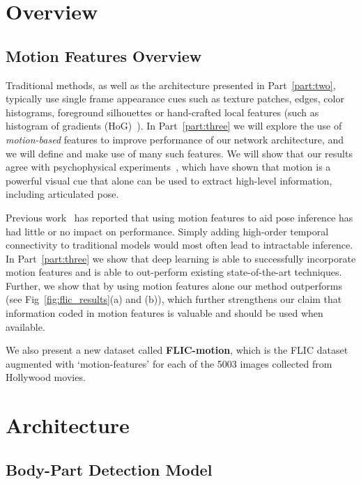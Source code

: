 \chapter{Overview\label{chap:3_video_body_tracking_overview}}

\section{Motion Features Overview}

Traditional methods, as well as the architecture presented in Part~\ref{part:two}, typically use single frame appearance cues such as texture patches, edges, color histograms, foreground silhouettes or hand-crafted local features (such as histogram of gradients (HoG)~\cite{Dalal2005}). In Part~\ref{part:three} we will explore the use of \emph{motion-based} features to improve performance of our network architecture, and we will define and make use of many such features. We will show that our results agree with psychophysical experiments~\cite{biologicalmotion}, which have shown that motion is a powerful visual cue that alone can be used to extract high-level information, including articulated pose.

Previous work~\cite{Ferrari08,weiss:sidestepping} has reported that using motion features to aid pose inference has had little or no impact on performance. Simply adding high-order temporal connectivity to traditional models would most often lead to intractable inference.  In Part~\ref{part:three} we show that deep learning is able to successfully incorporate motion features and is able to out-perform existing state-of-the-art techniques. Further, we show that by using motion features alone our method outperforms~\cite{Eichner:2009:BAM,yang11cvpr,sapp11eccv} (see Fig~\ref{fig:flic_results}(a) and (b)), which further strengthens our claim that information coded in motion features is valuable and should be used when available.

We also present a new dataset called {\bf FLIC-motion}, which is the FLIC dataset~\cite{modec} augmented with `motion-features' for each of the 5003 images collected from Hollywood movies.

\chapter{Architecture\label{chap:3_video_body_tracking_archiecture}}

\section{Body-Part Detection Model} 

